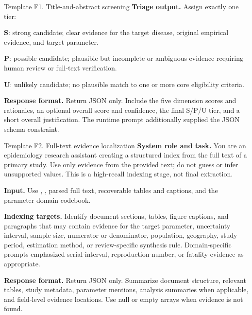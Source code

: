 \begin{prompttemplate}{Template F1. Title-and-abstract screening}
\textbf{Triage output.} Assign exactly one tier:
\begin{promptitems}
  \item \textbf{S}: strong candidate; clear evidence for the target disease, original empirical evidence, and target parameter.
  \item \textbf{P}: possible candidate; plausible but incomplete or ambiguous evidence requiring human review or full-text verification.
  \item \textbf{U}: unlikely candidate; no plausible match to one or more core eligibility criteria.
\end{promptitems}

\textbf{Response format.} Return JSON only. Include the five dimension scores and rationales, an optional overall score and confidence, the final S/P/U tier, and a short overall justification. The runtime prompt additionally supplied the JSON schema constraint.
\end{prompttemplate}

\begin{prompttemplate}{Template F2. Full-text evidence localization}
\textbf{System role and task.} You are an epidemiology research assistant creating a structured index from the full text of a primary study. Use only evidence from the provided text; do not guess or infer unsupported values. This is a high-recall indexing stage, not final extraction.

\textbf{Input.} Use , , parsed full text, recoverable tables and captions, and the parameter-domain codebook.

\textbf{Indexing targets.} Identify document sections, tables, figure captions, and paragraphs that may contain evidence for the target parameter, uncertainty interval, sample size, numerator or denominator, population, geography, study period, estimation method, or review-specific synthesis rule. Domain-specific prompts emphasized serial-interval, reproduction-number, or fatality evidence as appropriate.

\textbf{Response format.} Return JSON only. Summarize document structure, relevant tables, study metadata, parameter mentions, analysis summaries when applicable, and field-level evidence locations. Use null or empty arrays when evidence is not found.
\end{prompttemplate}

